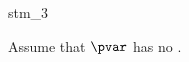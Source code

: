 \documentclass{stex}
\begin{document}
\begin{smodule}{stm_3}
  
  \begin{sassertion}[id=stm-3]
    Assume that $\pvar$ has no .
  \end{sassertion}
\end{smodule}
\end{document}
